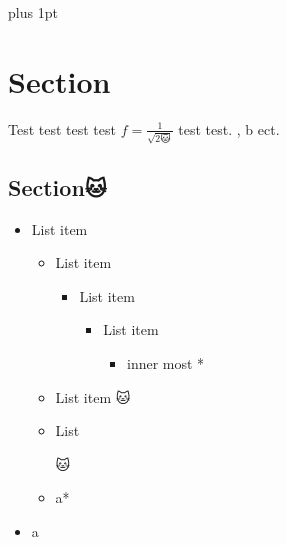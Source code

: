 \documentclass{article}
\begin{document}
    \graphicspath{{./images}}
    \setlength{\parindent}{0cm}
    \parskip=7pt plus 1pt



    \section{Section}
    Test test test test $f = \frac{1}{\sqrt{2🐱}}$ test test. \a, \🐱b ect.

    \subsection{Section🐱}
    \begin{center🐱}
        \begin{itemize}
            \item List item
            \begin{itemize}
                \item List item
                \begin{itemize}
                    \item List item
                    \begin{itemize}
                        \item List item
                        \begin{itemize}
                            \item inner most *
                        \end{itemize}
                    \end{itemize}
                \end{itemize}
                \item List item 🐱
                \item {List





                🐱}
                \item a*
            \end{itemize}
            \item a
        \end{itemize}
    \end{center🐱}
\end{document}
